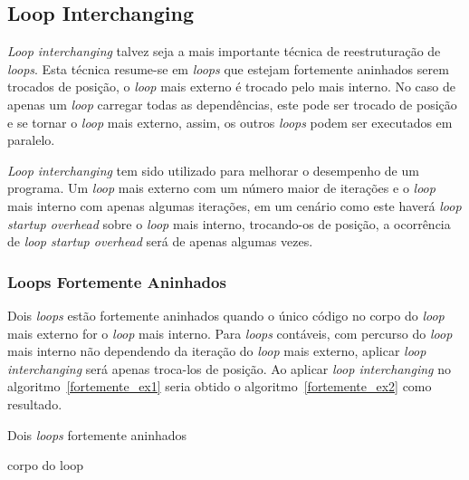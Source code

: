 \subsection{Loop Interchanging}

\textit{Loop interchanging} talvez seja a mais importante técnica de
reestruturação de \textit{loops}.
Esta técnica resume-se em \textit{loops} que estejam fortemente aninhados
serem trocados de posição, o \textit{loop} mais externo é trocado pelo mais
interno.
No caso de apenas um \textit{loop} carregar todas as dependências, este pode ser
trocado de posição e se tornar o \textit{loop} mais externo, assim, os outros
\textit{loops} podem ser executados em paralelo.

\textit{Loop interchanging} tem sido utilizado para melhorar o desempenho 
de um programa.
Um \textit{loop} mais externo com um número maior de iterações e o 
\textit{loop} mais interno com apenas algumas iterações, em um cenário como este
haverá \textit{loop startup overhead} sobre o \textit{loop} mais interno,
trocando-os de posição, a ocorrência de \textit{loop startup overhead} será de
apenas algumas vezes.

\subsubsection{Loops Fortemente Aninhados}

Dois \textit{loops} estão fortemente aninhados quando o único código no corpo do
\textit{loop} mais externo for o \textit{loop} mais interno.
Para \textit{loops} contáveis, com percurso do \textit{loop} mais interno não
dependendo da iteração do \textit{loop} mais externo, aplicar \textit{loop
interchanging} será apenas troca-los de posição.
Ao aplicar \textit{loop interchanging} no algoritmo~\ref{fortemente_ex1}
seria obtido o algoritmo~\ref{fortemente_ex2} como resultado.

\begin{algorithm}
\caption{Dois \textit{loops} fortemente aninhados}
\label{fortemente_ex1}
\begin{algorithmic}[1]

\STATE corpo do loop
\ENDFOR
\ENDFOR

\end{algorithmic}
\end{algorithm}


